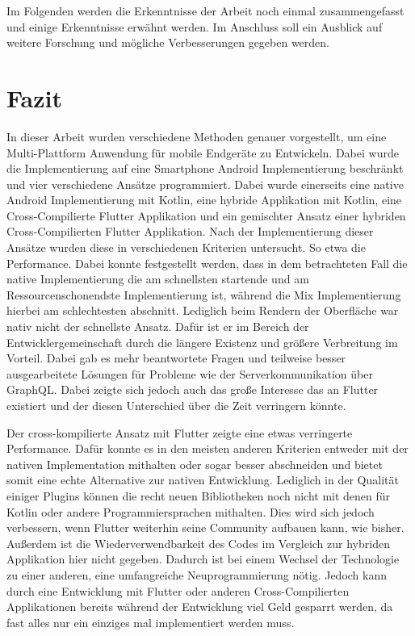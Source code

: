 Im Folgenden werden die Erkenntnisse der Arbeit noch einmal zusammengefasst und einige Erkenntnisse erwähnt werden. Im Anschluss soll ein Ausblick auf weitere Forschung und mögliche Verbesserungen gegeben werden.

\section{Fazit}
In dieser Arbeit wurden verschiedene Methoden genauer vorgestellt, um eine Multi-Plattform Anwendung für mobile Endgeräte zu Entwickeln. Dabei wurde die Implementierung auf eine Smartphone Android Implementierung beschränkt und vier verschiedene Ansätze programmiert. Dabei wurde einerseits eine native Android Implementierung mit Kotlin, eine hybride Applikation mit Kotlin, eine Cross-Compilierte Flutter Applikation und ein gemischter Ansatz einer hybriden Cross-Compilierten Flutter Applikation. Nach der Implementierung dieser Ansätze wurden diese in verschiedenen Kriterien untersucht. So etwa die Performance. Dabei konnte festgestellt werden, dass in dem betrachteten Fall die native Implementierung die am schnellsten startende und am Ressourcenschonendste Implementierung ist, während die Mix Implementierung hierbei am schlechtesten abschnitt. Lediglich beim Rendern der Oberfläche war nativ nicht der schnellste Ansatz. Dafür ist er im Bereich der Entwicklergemeinschaft durch die längere Existenz und größere Verbreitung im Vorteil. Dabei gab es mehr beantwortete Fragen und teilweise besser ausgearbeitete Lösungen für Probleme wie der Serverkommunikation über GraphQL. Dabei zeigte sich jedoch auch das große Interesse das an Flutter existiert und der diesen Unterschied über die Zeit verringern könnte.

Der cross-kompilierte Ansatz mit Flutter zeigte eine etwas verringerte Performance. Dafür konnte es in den meisten anderen Kriterien entweder mit der nativen Implementation mithalten oder sogar besser abschneiden und bietet somit eine echte Alternative zur nativen Entwicklung. Lediglich in der Qualität einiger Plugins können die recht neuen Bibliotheken noch nicht mit denen für Kotlin oder andere Programmiersprachen mithalten. Dies wird sich jedoch verbessern, wenn Flutter weiterhin seine Community aufbauen kann, wie bisher. Außerdem ist die Wiederverwendbarkeit des Codes im Vergleich zur hybriden Applikation hier nicht gegeben. Dadurch ist bei einem Wechsel der Technologie zu einer anderen, eine umfangreiche Neuprogrammierung nötig.
Jedoch kann durch eine Entwicklung mit Flutter oder anderen Cross-Compilierten Applikationen bereits während der Entwicklung viel Geld gesparrt werden, da fast alles nur ein einziges mal implementiert werden muss.

